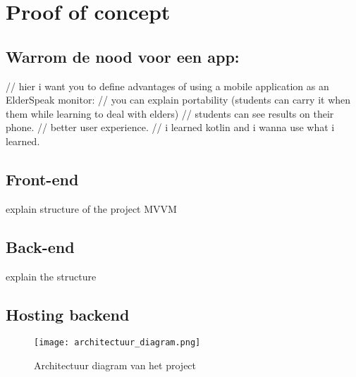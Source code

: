 
\chapter{Proof of concept}%
\label{ch:poc}

\section{Warrom de nood voor een app:}
// hier i want you to define advantages of using a mobile application as an ElderSpeak monitor:
    // you can explain portability (students can carry it when them while learning to deal with elders)
    // students can see results on their phone.
    // better user experience.
// i learned kotlin and i wanna use what i learned.

\section{Front-end}
explain structure of the project MVVM

\section{Back-end}
explain the structure

\section{Hosting backend}
\begin{figure}[h]
    \centering
    \texttt{[image: architectuur\_diagram.png]}
    \captionsetup{justification=centering}
    \caption{Architectuur diagram van het project}
    \label{fig:architectuur}
\end{figure}



